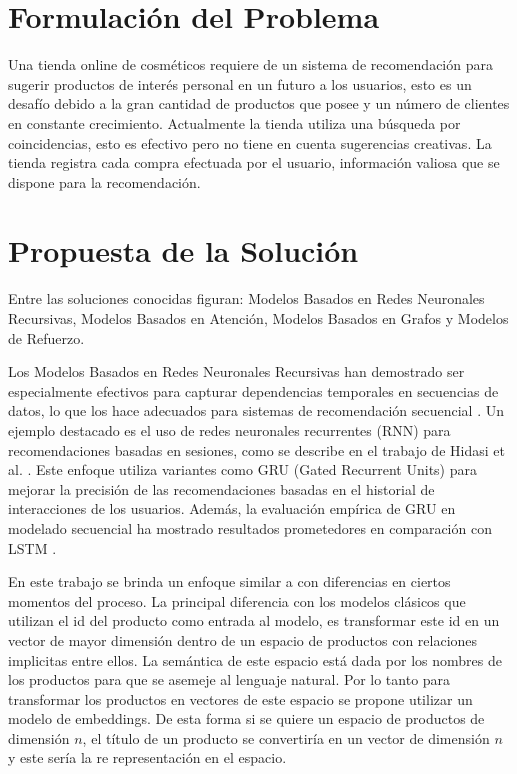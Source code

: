 \documentclass[runningheads]{llncs}
\begin{document}
\section{Formulación del Problema}

Una tienda online de cosméticos requiere de un sistema de recomendación para sugerir productos de interés personal en un futuro a los usuarios, esto es un desafío debido a la gran cantidad de productos que posee y un número de clientes en constante crecimiento. Actualmente la tienda utiliza una búsqueda por coincidencias, esto es efectivo pero no tiene en cuenta sugerencias creativas. La tienda registra cada compra efectuada por el usuario, información valiosa que se dispone para la recomendación.

\section{Propuesta de la Solución}

Entre las soluciones conocidas figuran: Modelos Basados en Redes Neuronales Recursivas, Modelos Basados en Atención, Modelos Basados en Grafos y Modelos de Refuerzo. 

Los Modelos Basados en Redes Neuronales Recursivas han demostrado ser especialmente efectivos para capturar dependencias temporales en secuencias de datos, lo que los hace adecuados para sistemas de recomendación secuencial \cite{goodfellow2016deep}. Un ejemplo destacado es el uso de redes neuronales recurrentes (RNN) para recomendaciones basadas en sesiones, como se describe en el trabajo de Hidasi et al. \cite{hidasi2016session}. Este enfoque utiliza variantes como GRU (Gated Recurrent Units) para mejorar la precisión de las recomendaciones basadas en el historial de interacciones de los usuarios. Además, la evaluación empírica de GRU en modelado secuencial ha mostrado resultados prometedores en comparación con LSTM \cite{chung2014empirical}.

En este trabajo se brinda un enfoque similar a \cite{hidasi2016session} con diferencias en ciertos momentos del proceso. La principal diferencia con los modelos clásicos que utilizan el id del producto como entrada al modelo, es transformar este id en un vector de mayor dimensión dentro de un espacio de productos con relaciones implicitas entre ellos. La semántica de este espacio está dada por los nombres de los productos para que se asemeje al lenguaje natural. Por lo tanto para transformar los productos en vectores de este espacio se propone utilizar un modelo de embeddings. De esta forma si se quiere un espacio de productos de dimensión $n$, el título de un producto se convertiría en un vector de dimensión $n$ y este sería la re representación en el espacio. 
\end{document}
